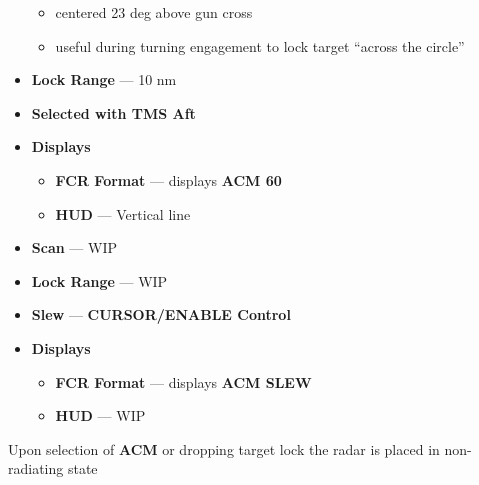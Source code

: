 \begin{tcoloritemize}
\begin{itemize}
\begin{itemize}
            \item centered 23 deg above gun cross
            \item useful during turning engagement to lock target ``across the circle''
        \end{itemize}
        \item \textbf{Lock Range} --- 10 nm
        \item \textbf{Selected with TMS Aft}
        \item \textbf{Displays}
        \begin{itemize}
            \item \textbf{FCR Format} --- displays \textbf{ACM 60}
            \item \textbf{HUD} --- Vertical line
        \end{itemize}
    \end{itemize}
    \begin{itemize}
        \item \textbf{Scan} --- WIP
        \item \textbf{Lock Range} --- WIP
        \item \textbf{Slew} --- \textbf{CURSOR/ENABLE Control}
        \item \textbf{Displays}
        \begin{itemize}
            \item \textbf{FCR Format} --- displays \textbf{ACM SLEW}
            \item \textbf{HUD} --- WIP
        \end{itemize}
    \end{itemize}
    \blueitem[NO RAD]
    Upon selection of \textbf{ACM} or dropping target lock the radar is placed in non-radiating state
\end{tcoloritemize}

\marginfigeometry

